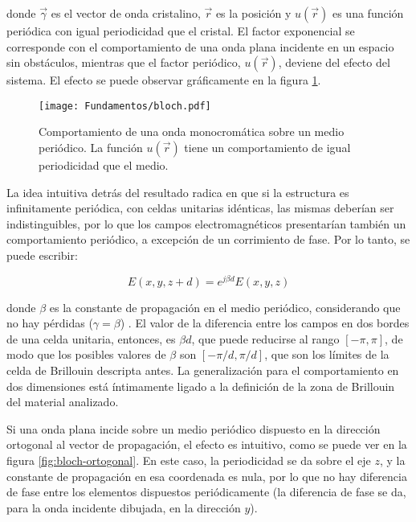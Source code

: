 donde $\vec{\gamma}$ es el vector de onda cristalino, $\vec{r}$ es la posición y $u(\vec{r})$ es una función periódica con igual periodicidad que el cristal. El factor exponencial se corresponde con el comportamiento de una onda plana incidente en un espacio sin obstáculos, mientras que el factor periódico, $u(\vec{r})$, deviene del efecto del sistema. El efecto se puede observar gráficamente en la figura \ref{fig:bloch-periodico-1d}.

\begin{figure}[htp]
	\centering
	\texttt{[image: Fundamentos/bloch.pdf]}
	\caption{Comportamiento de una onda monocromática sobre un medio periódico. La función $u(\vec{r})$ tiene un comportamiento de igual periodicidad que el medio.}
	\label{fig:bloch-periodico-1d}
\end{figure}

La idea intuitiva detrás del resultado radica en que si la estructura es infinitamente periódica, con celdas unitarias idénticas, las mismas deberían ser indistinguibles, por lo que los campos electromagnéticos presentarían también un comportamiento periódico, a excepción de un corrimiento de fase. Por lo tanto, se puede escribir:

\begin{equation}
	E(x,y,z+d) = e^{j \beta d} E(x,y,z)
\end{equation}

donde $\beta$ es la constante de propagación en el medio periódico, considerando que no hay pérdidas ($\gamma = \beta$) \cite{Capolino:TheoryPhenomenaMetamaterials}. El valor de la diferencia entre los campos en dos bordes de una celda unitaria, entonces, es $\beta d$, que puede reducirse al rango $[-\pi,\pi]$, de modo que los posibles valores de $\beta$ son $[-\pi/d,\pi/d]$, que son los límites de la celda de Brillouin descripta antes. La generalización para el comportamiento en dos dimensiones está íntimamente ligado a la definición de la zona de Brillouin del material analizado.

Si una onda plana incide sobre un medio periódico dispuesto en la dirección ortogonal al vector de propagación, el efecto es intuitivo, como se puede ver en la figura \ref{fig:bloch-ortogonal}. En este caso, la periodicidad se da sobre el eje $z$, y la constante de propagación en esa coordenada es nula, por lo que no hay diferencia de fase entre los elementos dispuestos periódicamente (la diferencia de fase se da, para la onda incidente dibujada, en la dirección $y$).


